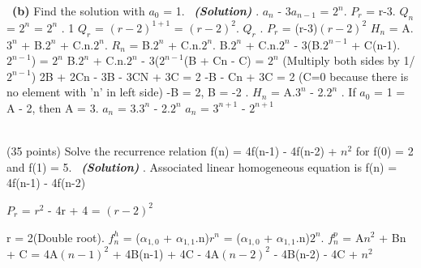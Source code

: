 \documentclass[a4 paper]{article}
\numberwithin{equation}{section}
\newcommand{\problem}[2]{~\\\fbox{\textbf{Problem #1}}\hfill (#2 points)\newline\newline}
\newcommand{\subproblem}[1]{~\newline\textbf{(#1)}}
\newcommand{\solution}{~\newline\textbf{\textit{(Solution)}} }
\newcommand{\0}{\mathbf{0}}
\begin{document}
\newpage
\subproblem{b} Find the solution with $a_0$ = 1.
\solution
\newline
{}. $a_n$ - 3$a_{n-1}$ = $2^n$\newline{}. $P_r$ = r-3\newline{}. $Q_n$ = $2^n$ = $2^n$ . 1 \newline
$Q_r$ = $(r-2)^{1+1}$ = $(r-2)^{2}$\newline{}. $Q_r$ . $P_r$ = (r-3)$(r-2)^{2}$\newline
$H_n$ = A.$3^n$ + B.$2^n$ + C.n.$2^n$\newline{}. $R_n$ = B.$2^n$ + C.n.$2^n$\newline{}. B.$2^n$ +  C.n.$2^n$ - 3(B.$2^{n-1}$ + C(n-1).$2^{n-1}$) = $2^n$\newline
B.$2^n$ +  C.n.$2^n$ - 3($2^{n-1}$(B + Cn - C) = $2^n$ (Multiply both sides by 1/$2^{n-1}$)\newline
2B + 2Cn - 3B - 3CN + 3C = 2\newline
-B - Cn + 3C = 2 (C=0 because there is no element with 'n' in left side)\newline
-B = 2, B = -2 \newline {}. $H_n$ = A.$3^n$ - 2.$2^n$ \newline {}. If $a_0$ = 1 = A - 2, then A = 3.\newline
$a_n$ = 3.$3^n$ - 2.$2^n$ \newline
$a_n$ = $3^{n+1}$ - $2^{n+1}$ \newline

\problem{2}{35}
Solve the recurrence relation f(n) = 4f(n-1) - 4f(n-2) + $n^2$ for f(0) = 2 and f(1) = 5. 
\solution
\newline{}. Associated linear homogeneous equation is f(n) = 4f(n-1) - 4f(n-2)\newline

$P_r$ = $r^2$ - 4r + 4 = $(r-2)^2$\newline

r = 2(Double root)\newline{}. $f_n^h$ = ($\alpha_{1,0}$ + $\alpha_{1,1}$.n)$r^n$ = ($\alpha_{1,0}$ + $\alpha_{1,1}$.n)$2^n$\newline{}. $f_n^p$ = A$n^2$ + Bn + C = 4A$(n-1)^2$ + 4B(n-1) + 4C - 4A$(n-2)^2$ - 4B(n-2) - 4C + $n^2$\newline
\end{document}
